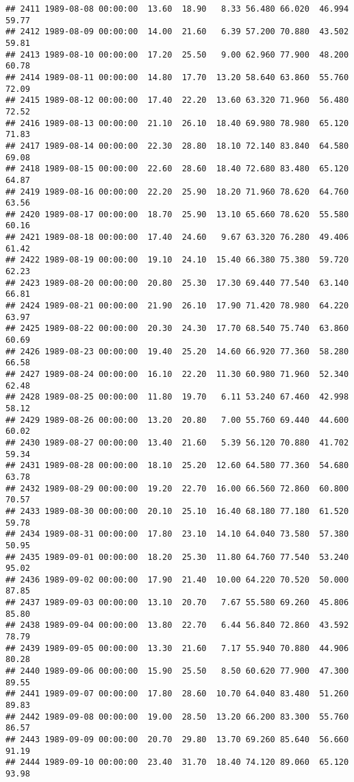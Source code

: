 \documentclass{article}\usepackage{graphicx, color}
\makeatletter
\newenvironment{kframe}{%
 \def\at@end@of@kframe{}%
 \ifinner\ifhmode%
  \def\at@end@of@kframe{\end{minipage}}%
  \begin{minipage}{\columnwidth}%
 \fi\fi%
 \def\FrameCommand##1{\hskip\@totalleftmargin \hskip-\fboxsep
 \colorbox{shadecolor}{##1}\hskip-\fboxsep
     \hskip-\linewidth \hskip-\@totalleftmargin \hskip\columnwidth}%
 \MakeFramed {\advance\hsize-\width
   \@totalleftmargin\z@ \linewidth\hsize
   \@setminipage}}%
 {\par\unskip\endMakeFramed%
 \at@end@of@kframe}
\newenvironment{knitrout}{}{} %
\makeatother
\begin{document}
\begin{knitrout}
\begin{kframe}
\begin{verbatim}
## 2411 1989-08-08 00:00:00  13.60  18.90   8.33 56.480 66.020  46.994  59.77
## 2412 1989-08-09 00:00:00  14.00  21.60   6.39 57.200 70.880  43.502  59.81
## 2413 1989-08-10 00:00:00  17.20  25.50   9.00 62.960 77.900  48.200  60.78
## 2414 1989-08-11 00:00:00  14.80  17.70  13.20 58.640 63.860  55.760  72.09
## 2415 1989-08-12 00:00:00  17.40  22.20  13.60 63.320 71.960  56.480  72.52
## 2416 1989-08-13 00:00:00  21.10  26.10  18.40 69.980 78.980  65.120  71.83
## 2417 1989-08-14 00:00:00  22.30  28.80  18.10 72.140 83.840  64.580  69.08
## 2418 1989-08-15 00:00:00  22.60  28.60  18.40 72.680 83.480  65.120  64.87
## 2419 1989-08-16 00:00:00  22.20  25.90  18.20 71.960 78.620  64.760  63.56
## 2420 1989-08-17 00:00:00  18.70  25.90  13.10 65.660 78.620  55.580  60.16
## 2421 1989-08-18 00:00:00  17.40  24.60   9.67 63.320 76.280  49.406  61.42
## 2422 1989-08-19 00:00:00  19.10  24.10  15.40 66.380 75.380  59.720  62.23
## 2423 1989-08-20 00:00:00  20.80  25.30  17.30 69.440 77.540  63.140  66.81
## 2424 1989-08-21 00:00:00  21.90  26.10  17.90 71.420 78.980  64.220  63.97
## 2425 1989-08-22 00:00:00  20.30  24.30  17.70 68.540 75.740  63.860  60.69
## 2426 1989-08-23 00:00:00  19.40  25.20  14.60 66.920 77.360  58.280  66.58
## 2427 1989-08-24 00:00:00  16.10  22.20  11.30 60.980 71.960  52.340  62.48
## 2428 1989-08-25 00:00:00  11.80  19.70   6.11 53.240 67.460  42.998  58.12
## 2429 1989-08-26 00:00:00  13.20  20.80   7.00 55.760 69.440  44.600  60.02
## 2430 1989-08-27 00:00:00  13.40  21.60   5.39 56.120 70.880  41.702  59.34
## 2431 1989-08-28 00:00:00  18.10  25.20  12.60 64.580 77.360  54.680  63.78
## 2432 1989-08-29 00:00:00  19.20  22.70  16.00 66.560 72.860  60.800  70.57
## 2433 1989-08-30 00:00:00  20.10  25.10  16.40 68.180 77.180  61.520  59.78
## 2434 1989-08-31 00:00:00  17.80  23.10  14.10 64.040 73.580  57.380  50.95
## 2435 1989-09-01 00:00:00  18.20  25.30  11.80 64.760 77.540  53.240  95.02
## 2436 1989-09-02 00:00:00  17.90  21.40  10.00 64.220 70.520  50.000  87.85
## 2437 1989-09-03 00:00:00  13.10  20.70   7.67 55.580 69.260  45.806  85.80
## 2438 1989-09-04 00:00:00  13.80  22.70   6.44 56.840 72.860  43.592  78.79
## 2439 1989-09-05 00:00:00  13.30  21.60   7.17 55.940 70.880  44.906  80.28
## 2440 1989-09-06 00:00:00  15.90  25.50   8.50 60.620 77.900  47.300  89.55
## 2441 1989-09-07 00:00:00  17.80  28.60  10.70 64.040 83.480  51.260  89.83
## 2442 1989-09-08 00:00:00  19.00  28.50  13.20 66.200 83.300  55.760  86.57
## 2443 1989-09-09 00:00:00  20.70  29.80  13.70 69.260 85.640  56.660  91.19
## 2444 1989-09-10 00:00:00  23.40  31.70  18.40 74.120 89.060  65.120  93.98

\end{verbatim}
\end{kframe}
\end{knitrout}
\end{document}
